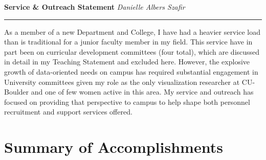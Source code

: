 \documentclass[11pt]{article}
\begin{document}
\setlength{\belowcaptionskip}{-10pt}

\thispagestyle{fancy}

\textbf{\Large Service \& Outreach Statement}
{\hspace{145pt}\emph{Danielle Albers Szafir} \vspace{3pt}}
\hrule

As a member of a new Department and College, I have had a heavier service load than is traditional for a junior faculty member in my field. This service have in part been on curricular development committees (four total), which are discussed in detail in my Teaching Statement and excluded here. However, the explosive growth of data-oriented needs on campus has required substantial engagement in University committees given my role as the only visualization researcher at CU-Boulder and one of few women active in this area. My service and outreach has focused on providing that perspective to campus to help shape both personnel recruitment and support services offered. 


\section*{Summary of Accomplishments}
\end{document}
